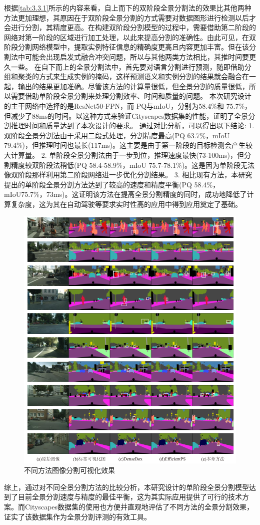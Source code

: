 根据\cref*{tab:3.3.1}所示的内容来看，自上而下的双阶段全景分割法的效果比其他两种方法更加理想，其原因在于双阶段全景分割的方式需要对数据图形进行检测以后才会进行分割，其精度更高。在构建双阶段分割模型的过程中，需要借助第二阶段的网络对第一阶段的区域进行加工处理，以此来提高分割的准确性。由此可见，在双阶段分割网络模型中，提取实例特征信息的精确度更高且内容更加丰富。但在该分割法中可能会出现启发式融合冲突问题，所以与其他两类方法相比，其推时间要更久一些。
在自下而上的全景分割法中，首先要对语言分割进行预测，随即借助分组和聚类的方式来生成实例的掩码，这样预测语义和实例分割的结果就会融合在一起，输出的结果更加准确。尽管该方法的计算量很低，但全景分割的质量很低，所以需要借助单阶段全景分割来处理分割效率、时间和质量的问题。
本次研究设计的主干网络中选择的是ResNet50-FPN，而 PQ与mIoU，分别为58.4\%和 75.7\%，但减少了88ms的时间。以这种方式来验证Cityscapes数据集的性能，证明了全景分割推理时间和质量达到了本次设计的要求。
通过对比分析，可以得出以下结论:
1. 双阶段全景分割法由于采用二段式处理，分割精度最高(PQ 63.7\%，mIoU 79.4\%)，但推理时间也最长(117ms)。这主要是由于第一阶段的目标检测会产生较大计算量。
2. 单阶段全景分割法由于一步到位，推理速度最快(73-100ms)，但分割精度较双阶段法稍低(PQ 58.4-58.9\%，mIoU 75.7-78.1\%)。这是因为单阶段无法像双阶段那样利用第二阶段网络进一步优化分割结果。
3. 相比现有方法，本研究提出的单阶段全景分割方法达到了较高的速度和精度平衡(PQ 58.4\%，mIoU75.7\%，73ms)。这证明该方法在提高全景分割精度的同时，成功地降低了计算复杂度，这为其在自动驾驶等要求实时性高的应用中得到应用奠定了基础。

\begin{figure}[htb]
    \centering
    \includegraphics[width=12cm]{fig/chap3/可视化.png}
    \caption{不同方法图像分割可视化效果}
    \label{fig:3.3.2}
\end{figure}
综上，通过对不同全景分割方法的比较分析，本研究设计的单阶段全景分割模型达到了目前全景分割速度与精度的最佳平衡，这为其实际应用提供了可行的技术方案。而Cityscapes数据集的使用也方便并直观地评估了不同方法的全景分割效果，证实了该数据集作为全景分割评测的有效工具。



